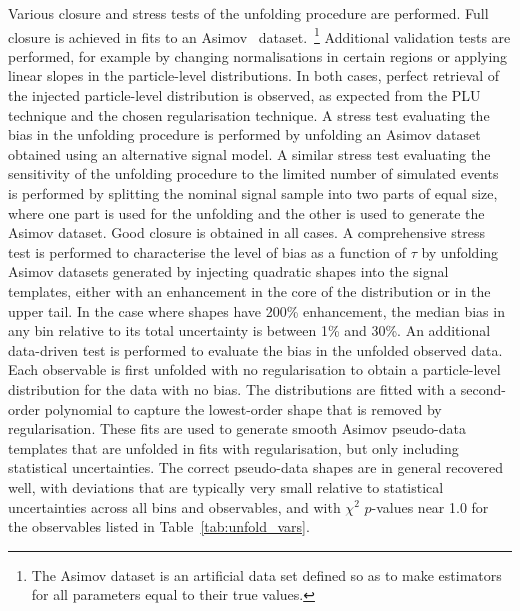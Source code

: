 \documentclass[cernpreprint, atlasdraft=false, texlive=2023, UKenglish, texmf, orcidlogo]{atlasdoc}
\begin{document}
Various closure and stress tests of the unfolding procedure are
performed.  Full closure is achieved in fits to an
Asimov~\cite{Cowan:2010js} dataset.~\footnote{The Asimov dataset is an artificial data set
defined so as to make estimators for all parameters equal to their true values.}
Additional validation tests are
performed, for example by changing normalisations in certain
regions or applying linear slopes in the particle-level
distributions. In both cases, perfect retrieval of the injected
particle-level distribution is observed, as expected from the PLU
technique and the chosen regularisation technique.  A stress test
evaluating the bias in the unfolding procedure is performed by
unfolding an Asimov dataset obtained using an alternative signal
model.  A similar stress test evaluating the sensitivity of the
unfolding procedure to the limited number of simulated events is
performed by splitting the nominal signal sample into two parts of
equal size, where one part is used for the unfolding and the other is
used to generate the Asimov dataset.
Good closure is obtained in all cases.  A comprehensive
stress test is performed to characterise the level of bias as a
function of $\tau$ by unfolding Asimov datasets generated by injecting
quadratic shapes into the signal templates, either with an enhancement
in the core of the distribution or in the upper tail. In the case
where shapes have 200\% enhancement, the median bias in any bin
relative to its total uncertainty is between 1\% and 30\%.  An
additional data-driven test is performed to evaluate the bias in
the unfolded observed data. Each observable is first unfolded with no
regularisation to obtain a particle-level distribution for the data
with no bias. The distributions are fitted with a second-order polynomial
to capture the lowest-order shape that is removed by regularisation.
These fits are used to generate smooth Asimov pseudo-data templates
that are unfolded in fits with regularisation, but only including
statistical uncertainties. The correct pseudo-data shapes are in
general recovered well, with deviations that are typically very small relative
to statistical uncertainties across all bins and observables, and with
$\chi^2$ $p$-values near 1.0 for the observables listed in Table~\ref{tab:unfold_vars}.
 
 
 
 
 
\end{document}
